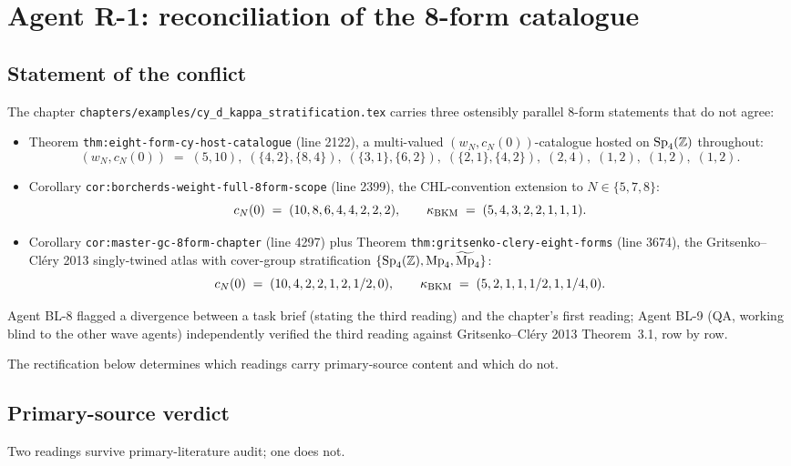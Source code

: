 \chapter*{Agent R-1: reconciliation of the 8-form catalogue}

\section*{Statement of the conflict}

The chapter \texttt{chapters/examples/cy\_d\_kappa\_stratification.tex}
carries three ostensibly parallel 8-form statements that do not agree:

\begin{itemize}
\item Theorem \texttt{thm:eight-form-cy-host-catalogue} (line 2122), a
multi-valued $(w_N, c_N(0))$-catalogue hosted on $\mathrm{Sp}_4(\mathbb Z)$ throughout:
\[
 (w_N, c_N(0)) \;=\;
 (5,10),\; (\{4,2\}, \{8,4\}),\; (\{3,1\}, \{6,2\}),\;
 (\{2,1\}, \{4,2\}),\; (2,4),\; (1,2),\; (1,2),\; (1,2).
\]
\item Corollary \texttt{cor:borcherds-weight-full-8form-scope} (line
2399), the CHL-convention extension to $N \in \{5, 7, 8\}$:
\[
 c_N(0) \;=\; (10, 8, 6, 4, 4, 2, 2, 2),
 \qquad
 \kappa_{\mathrm{BKM}} \;=\; (5, 4, 3, 2, 2, 1, 1, 1).
\]
\item Corollary \texttt{cor:master-gc-8form-chapter} (line 4297) plus
Theorem \texttt{thm:gritsenko-clery-eight-forms} (line 3674), the
Gritsenko--Cl\'ery 2013 singly-twined atlas with cover-group
stratification $\{\mathrm{Sp}_4(\mathbb Z), \mathrm{Mp}_4, \widetilde{\mathrm{Mp}}_4\}$:
\[
 c_N(0) \;=\; (10, 4, 2, 2, 1, 2, 1/2, 0),
 \qquad
 \kappa_{\mathrm{BKM}} \;=\; (5, 2, 1, 1, 1/2, 1, 1/4, 0).
\]
\end{itemize}

Agent BL-8 flagged a divergence between a task brief (stating the
third reading) and the chapter's first reading; Agent BL-9 (QA, working
blind to the other wave agents) independently verified the third
reading against Gritsenko--Cl\'ery 2013 Theorem~3.1, row by row.

The rectification below determines which readings carry primary-source
content and which do not.

\section*{Primary-source verdict}

Two readings survive primary-literature audit; one does not.

